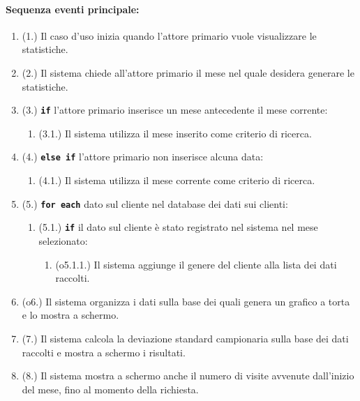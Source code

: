 \documentclass{article}
\begin{document}
	\paragraph{Sequenza eventi principale:}
	\begin{enumerate}[itemsep=8pt,parsep=0pt]
	    \item (1.) Il caso d'uso inizia quando l'attore primario vuole visualizzare le statistiche. 
		\item (2.) Il sistema chiede all'attore primario il mese nel quale desidera generare le statistiche.
		\item (3.) \texttt{\textbf{if}} l'attore primario inserisce un mese antecedente il mese corrente:
			\begin{enumerate}	[leftmargin=28pt]
				\item (3.1.) Il sistema utilizza il mese inserito come criterio di ricerca.
  			\end{enumerate}	
		\item (4.) \texttt{\textbf{else if}} l'attore primario non inserisce alcuna data:
			\begin{enumerate}	[leftmargin=28pt]
				\item (4.1.) Il sistema utilizza il mese corrente come criterio di ricerca.
  			\end{enumerate}

		\item (5.) \texttt{\textbf{for each}} dato sul cliente nel database dei dati sui clienti:
		    \begin{enumerate}	[leftmargin=28pt]
				\item (5.1.) \texttt{\textbf{if}} il dato sul cliente è stato registrato nel sistema nel mese selezionato:
					\begin{enumerate}	[leftmargin=28pt]
						\item (o5.1.1.) Il sistema aggiunge il genere del cliente alla lista dei dati raccolti.
		  			\end{enumerate}	
  		    \end{enumerate}

	    \item (o6.) Il sistema organizza i dati sulla base dei quali genera un grafico a torta e lo mostra a schermo.
	    \item (7.) Il sistema calcola la deviazione standard campionaria sulla base dei dati raccolti e mostra a schermo i risultati.
	    \item (8.) Il sistema mostra a schermo anche il numero di visite avvenute dall'inizio del mese, fino al momento della richiesta. %
	\end{enumerate}
	
\end{document}
